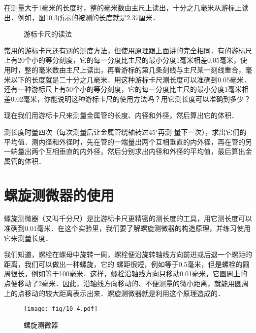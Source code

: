 在测量大于1毫米的长度时，整的毫米数由主尺上读出，十分之几毫米从游标上读出．例如，图10.3所示的被测的长度就是2.37厘米．	
	
\begin{figure}[htp]\centering
    \caption{游标卡尺的读法}
\end{figure}	
	
常用的游标卡尺还有别的测度方法，但使用原理跟上面讲的完全相同．有的游标尺上有20个小的等分刻度，它的每一分度比主尺的最小分度1毫米相差0.05毫米，使用时，整的毫米数由主尺上读出，再看游标的第几条刻线与主尺某一刻线重合，毫米以下的长度就是二十分之几毫米．用这种游标卡尺测长度可以准确到0.05毫米．还有一种游标尺上有50个小的等分刻度，它的每一分度比主尺的最小分度1毫米相差0.02毫米，你能说明这种游标卡尺的使用方法吗？用它测长度可以准确到多少？

现在我们用游标卡尺来测量金属管的长度、内径和外径，然后算出它的体积．

测长度时量四次（每次测量后让金属管绕轴转过45$^\circ$再测
量下一次），求出它们的平均值．测内径和外径时，先在管的一端量出两个互相垂直的内外径，再在管的另一端量出两个互相垂直的内外径，然后分别求出内径和外径的平均值，最后算出金属管的体积．

\section{螺旋测微器的使用}
螺旋测微器（又叫千分尺）是比游标卡尺更精密的测长度的工具，用它测长度可以准确到0.01毫米．在这个实验里，我们要了解螺旋测微器的构造原理，并练习使用它来测量长度．

我们知道，螺栓在螺母中旋转一周，螺栓便沿旋转轴线方向前进或后退一个螺距的距离，我们可以做出一种螺旋，它的	
螺距很短，例如等于0.5毫米，但是螺栓的圆周很长，例如等于100毫米．这样，螺栓沿轴线方向只移动0.01毫米，它圆周上的点便移动了2毫米．因此，沿轴线方向移动的、不便测量的微小距离，就能用圆周上的点移动的较大距离表示出来．螺旋测微器就是利用这个原理造成的．
\begin{figure}[htp]
    \centering
    \texttt{[image: fig/10-4.pdf]}
    \caption{螺旋测微器}
\end{figure}

